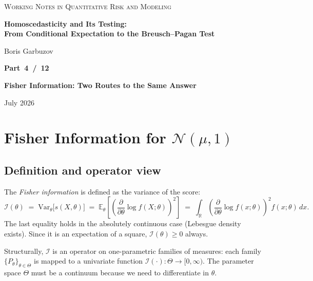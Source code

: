\documentclass[a4paper,oneside,12pt]{extarticle}
\theoremstyle{plain}
\theoremstyle{definition}
\theoremstyle{remark}
\newcommand*{\E}{\mathbb{E}}
\newcommand*{\Var}{\mathrm{Var}}
\begin{document}
\begin{titlepage}
\begin{center}

{\footnotesize\scshape\color{gray}
Working Notes in Quantitative Risk and Modeling
}

\vfill

{\LARGE\bfseries Homoscedasticity and Its Testing:\\[4pt]
From Conditional Expectation to the Breusch--Pagan Test}

\vspace{36pt}

{\normalsize Boris Garbuzov}

\vfill

{\Large\bfseries Part~4~/~12}

\vspace{6pt}

{\Large\bfseries Fisher Information: Two Routes to the Same Answer}

\vfill

{\small July 2026}

\end{center}
\end{titlepage}

\tableofcontents
\newpage

\section{Fisher Information for $\mathcal{N}(\mu,1)$}

\subsection{Definition and operator view}

The \emph{Fisher information} is defined as the variance of the score:
\[
  \mathcal{I}(\theta)
  \;=\; \Var_\theta\bigl[s(X,\theta)\bigr]
  \;=\; \E_\theta\!\left[\left(\frac{\partial}{\partial\theta}
        \log f(X;\theta)\right)^{\!2}\right]
  \;=\; \int_{\mathbb{R}}
        \!\left(\frac{\partial}{\partial\theta}\log f(x;\theta)\right)^{\!2}
        f(x;\theta)\,dx.
\]
The last equality holds in the absolutely continuous case (Lebesgue
density exists).  Since it is an expectation of a square,
$\mathcal{I}(\theta)\ge 0$ always.

Structurally, $\mathcal{I}$ is an operator on one-parametric families
of measures: each family $\{P_\theta\}_{\theta\in\Theta}$ is mapped to
a univariate function $\mathcal{I}(\cdot)\colon\Theta\to[0,\infty)$.
The parameter space $\Theta$ must be a continuum because we need to
differentiate in $\theta$.
\end{document}
